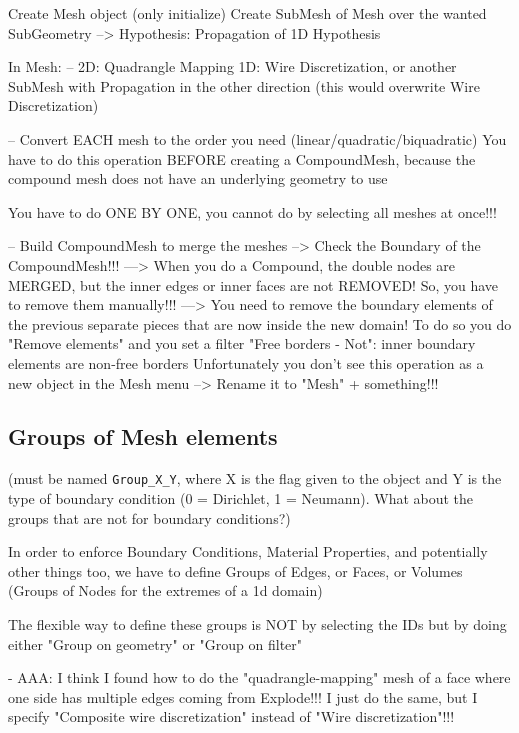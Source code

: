 \documentclass[10pt]{book}
\begin{document}
Create Mesh object (only initialize)
Create SubMesh of Mesh over the wanted SubGeometry
   --> Hypothesis: Propagation of 1D Hypothesis

In Mesh:
--   2D: Quadrangle Mapping
   1D: Wire Discretization, or another SubMesh with Propagation in the other direction (this would overwrite Wire Discretization)

-- Convert EACH mesh to the order you need (linear/quadratic/biquadratic)
  You have to do this operation BEFORE creating a CompoundMesh,
  because the compound mesh does not have an underlying geometry to use 
   
  You have to do ONE BY ONE, you cannot do by selecting all meshes at once!!! 
   
-- Build CompoundMesh to merge the meshes
     --> Check the Boundary of the CompoundMesh!!! 
     ---> When you do a Compound, the double nodes are MERGED, but the inner edges or inner faces are not REMOVED! So, you have to remove them manually!!!
     ---> You need to remove the boundary elements of the previous separate pieces that are now inside the new domain!
          To do so you do "Remove elements" and you set a filter "Free borders - Not": inner boundary elements are non-free borders
          Unfortunately you don't see this operation as a new object in the Mesh menu
     --> Rename it to "Mesh" + something!!!
     
\subsection{Groups of Mesh elements}
 
  (must be named \verb|Group_X_Y|, where X is the flag given to the object and Y is the type of boundary condition (0 = Dirichlet, 1 = Neumann). What about the groups that are not for boundary conditions?)

  In order to enforce Boundary Conditions, Material Properties, and potentially other things too,
  we have to define Groups of Edges, or Faces, or Volumes (Groups of Nodes for the extremes of a 1d domain)
  
  The flexible way to define these groups is NOT by selecting the IDs but by doing either "Group on geometry" or "Group on filter"

- AAA: I think I found how to do the "quadrangle-mapping" mesh of a face where one side has multiple edges coming from Explode!!! 
  I just do the same, but I specify "Composite wire discretization" instead of "Wire discretization"!!!
\end{document}
